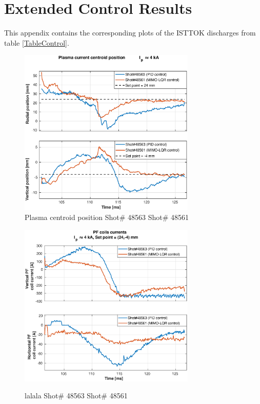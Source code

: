 \chapter{Extended Control Results }

This appendix contains the corresponding plots of the ISTTOK discharges from table \ref{TableControl}.

\begin{figure}
	\centering
	\includegraphics[width=0.75\textwidth]{Chp5/PIDvsMIMO_563_561_2.eps}
	\caption{Plasma centroid position Shot\# 48563 Shot\# 48561}
\end{figure}

\begin{figure}
	\centering
	\includegraphics[width=0.75\textwidth]{Chp5/PIDvsMIMO_563_561_curr_2.eps}
	\label{564_559curr}
	\caption{lalala  Shot\# 48563 Shot\# 48561}
\end{figure}

